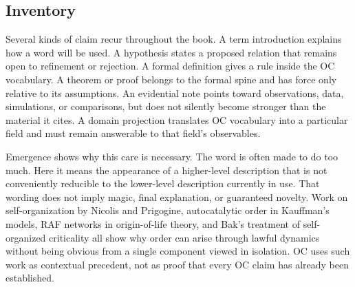 \documentclass[11pt,a4paper,openany]{book}
\begin{document}
\subsection{Inventory}
Several kinds of claim recur throughout the book. A term introduction explains how a word will be used. A hypothesis states a proposed relation that remains open to refinement or rejection. A formal definition gives a rule inside the OC vocabulary. A theorem or proof belongs to the formal spine and has force only relative to its assumptions. An evidential note points toward observations, data, simulations, or comparisons, but does not silently become stronger than the material it cites. A domain projection translates OC vocabulary into a particular field and must remain answerable to that field's observables. \cite{nicolis_prigogine_selforg,kauffman_autocatalytic}\par
Emergence shows why this care is necessary. The word is often made to do too much. Here it means the appearance of a higher-level description that is not conveniently reducible to the lower-level description currently in use. That wording does not imply magic, final explanation, or guaranteed novelty. Work on self-organization by Nicolis and Prigogine, autocatalytic order in Kauffman's models, RAF networks in origin-of-life theory, and Bak's treatment of self-organized criticality all show why order can arise through lawful dynamics without being obvious from a single component viewed in isolation. OC uses such work as contextual precedent, not as proof that every OC claim has already been established.\par
\end{document}
